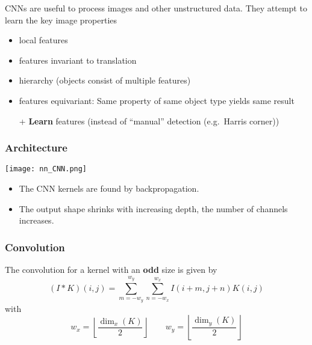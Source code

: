 CNNs are useful to process images and other unstructured data. They attempt to learn the key image properties
\begin{itemize}
    \item local features
    \item features invariant to translation
    \item hierarchy (objects consist of multiple features)
    \item features equivariant: Same property of same object type yields same result
\end{itemize}

\newpar{}
\begin{itemize}
    \item [+] \textbf{Learn} features (instead of ``manual'' detection (e.g.\ Harris corner))
\end{itemize}

\subsubsection{Architecture}
\begin{center}
    \texttt{[image: nn\_CNN.png]}
\end{center}
\newpar{}
\begin{itemize}
    \item The CNN kernels are found by backpropagation.
    \item The output shape shrinks with increasing depth, the number of channels increases.
\end{itemize}


\subsubsection{Convolution}
The convolution for a kernel with an \textbf{odd} size is given by
\begin{equation*}
    (I * K)(i,j) = \sum_{m=-w_y}^{w_y}\sum_{n=-w_x}^{w_x}I(i+m,j+n)K(i,j)
\end{equation*}
with
\begin{equation*}
    w_x = \left\lfloor \frac{\dim_x(K)}{2} \right\rfloor \qquad
    w_y = \left\lfloor \frac{\dim_y(K)}{2} \right\rfloor
\end{equation*}

